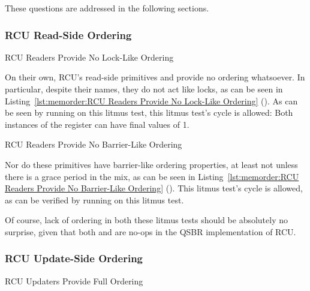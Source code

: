 These questions are addressed in the following sections.

\subsubsection{RCU Read-Side Ordering}
\label{sec:memorder:RCU Read-Side Ordering}

\begin{listing}[tb]

\caption{RCU Readers Provide No Lock-Like Ordering}
\label{lst:memorder:RCU Readers Provide No Lock-Like Ordering}
\end{listing}

On their own, RCU's read-side primitives  and
 provide no ordering whatsoever.
In particular, despite their names, they do not act like locks, as can
be seen in
Listing~\ref{lst:memorder:RCU Readers Provide No Lock-Like Ordering}
().
As can be seen by running  on this litmus test, this litmus
test's cycle is allowed: Both instances of the  register can
have final values of 1.

\begin{listing}[tb]

\caption{RCU Readers Provide No Barrier-Like Ordering}
\label{lst:memorder:RCU Readers Provide No Barrier-Like Ordering}
\end{listing}

Nor do these primitives have barrier-like ordering properties,
at least not unless there is a grace period in the mix, as can be seen in
Listing~\ref{lst:memorder:RCU Readers Provide No Barrier-Like Ordering}
().
This litmus test's cycle is allowed, as can be verified by running
 on this litmus test.

Of course, lack of ordering in both these litmus tests should be absolutely
no surprise, given that both  and 
are no-ops in the QSBR implementation of RCU.

\subsubsection{RCU Update-Side Ordering}
\label{sec:memorder:RCU Update-Side Ordering}

\begin{listing}[tb]

\caption{RCU Updaters Provide Full Ordering}
\label{lst:memorder:RCU Updaters Provide Full Ordering}
\end{listing}

